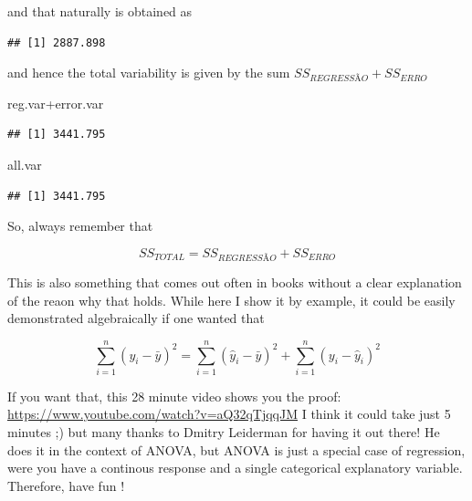 \documentclass[
]{book}
\newenvironment{Shaded}{\begin{snugshade}}{\end{snugshade}}
\newcommand{\DecValTok}[1]{\textcolor[rgb]{0.00,0.00,0.81}{#1}}
\newcommand{\FunctionTok}[1]{\textcolor[rgb]{0.00,0.00,0.00}{#1}}
\newcommand{\NormalTok}[1]{#1}
\newcommand{\OtherTok}[1]{\textcolor[rgb]{0.56,0.35,0.01}{#1}}
\newcommand{\SpecialCharTok}[1]{\textcolor[rgb]{0.00,0.00,0.00}{#1}}
\begin{document}
and that naturally is obtained as

\begin{Shaded}
\end{Shaded}

\begin{verbatim}
## [1] 2887.898
\end{verbatim}

and hence the total variability is given by the sum \(SS_{REGRESSÃO}+SS_{ERRO}\)

\begin{Shaded}
\begin{Highlighting}[]
\NormalTok{reg.var}\SpecialCharTok{+}\NormalTok{error.var}
\end{Highlighting}
\end{Shaded}

\begin{verbatim}
## [1] 3441.795
\end{verbatim}

\begin{Shaded}
\begin{Highlighting}[]
\NormalTok{all.var}
\end{Highlighting}
\end{Shaded}

\begin{verbatim}
## [1] 3441.795
\end{verbatim}

So, always remember that

\[SS_{TOTAL}=SS_{REGRESSÃO}+SS_{ERRO}\]

This is also something that comes out often in books without a clear explanation of the reaon why that holds. While here I show it by example, it could be easily demonstrated algebraically if one wanted that

\[\sum_{i=1}^n (y_i- \bar y)^2=\sum_{i=1}^n (\hat y_i- \bar y)^2 + \sum_{i=1}^n (y_i- \hat y_i)^2\]

If you want that, this 28 minute video shows you the proof: \url{https://www.youtube.com/watch?v=aQ32qTjqqJM}
I think it could take just 5 minutes ;) but many thanks to Dmitry Leiderman for having it out there! He does it in the context of ANOVA, but ANOVA is just a special case of regression, were you have a continous response and a single categorical explanatory variable. Therefore, have fun !
\end{document}

